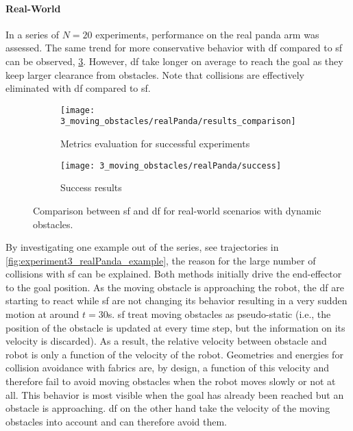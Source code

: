 \paragraph{Real-World}
In a series of $N=20$ experiments, performance on the real panda arm was assessed. The same
trend for more conservative behavior with \ac{df} compared to \ac{sf} can be observed,
\cref{fig:experiment3_realPanda}. However, \ac{df} take longer on average to reach the
goal as they keep larger clearance from obstacles. Note that collisions are effectively
eliminated with \ac{df} compared to \ac{sf}.

\begin{figure}[ht]
  \centering
  \begin{subfigure}{1.0\linewidth}
    \centering
    \texttt{[image: 3\_moving\_obstacles/realPanda/results\_comparison]}
    \caption{Metrics evaluation for successful experiments}%
    \label{subfig:experiment3_realPanda_res}
  \end{subfigure}
  \begin{subfigure}{1.0\linewidth}
    \centering
    \texttt{[image: 3\_moving\_obstacles/realPanda/success]}
    \caption{Success results}%
    \label{subfig:experiment3_realPanda_success}
  \end{subfigure}
  \caption{Comparison between \ac{sf} and \ac{df} for real-world scenarios with dynamic obstacles.
  }%
  \label{fig:experiment3_realPanda}
\end{figure}


By investigating one example out of the series, see trajectories in
\cref{fig:experiment3_realPanda_example}, the reason for the large number of collisions
with \ac{sf} can be explained.
Both methods initially drive
the end-effector to the goal position. As the moving obstacle is approaching the robot,
the \ac{df} are starting to react while \ac{sf} are not changing its behavior resulting
in a very sudden motion at around $t=30$s.
\ac{sf} treat moving obstacles as pseudo-static (i.e., the position of the obstacle
is updated at every time step, but the information on its velocity is discarded).  As a
result, the relative velocity between obstacle and robot is only a function of the
velocity of the robot. Geometries and energies for collision avoidance with fabrics are,
by design, a function of this velocity and therefore fail to avoid moving obstacles when
the robot moves slowly or not at all. This behavior is most visible when the goal has
already been reached but an obstacle is approaching. \ac{df} on the other hand
take the velocity of the moving obstacles into account and can therefore avoid them.


